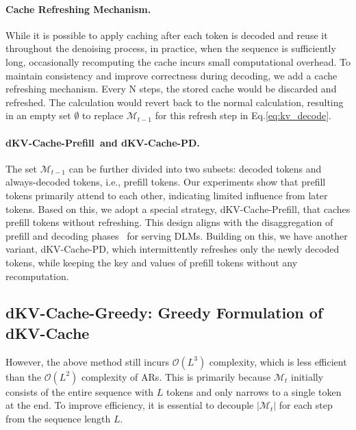 \documentclass{article}
\newcommand{\pmethodname}{dKV-Cache-Prefill}
\newcommand{\pdmethodname}{dKV-Cache-PD}
\begin{document}
\paragraph{Cache Refreshing Mechanism.} While it is possible to apply caching after each token is decoded and reuse it throughout the denoising process, in practice, when the sequence is sufficiently long, occasionally recomputing the cache incurs small computational overhead. To maintain consistency and improve correctness during decoding, we add a cache refreshing mechanism. Every N steps, the stored cache would be discarded and refreshed. The calculation would revert back to the normal calculation, resulting in an empty set $\emptyset$ to replace $\mathcal{M}_{t-1}$ for this refresh step in Eq.\ref{eq:kv_decode}. 

\paragraph{\pmethodname\ and \pdmethodname.} The set $\mathcal{M}_{t-1}$ can be further divided into two subsets: decoded tokens and always-decoded tokens, i.e., prefill tokens. Our experiments show that prefill tokens primarily attend to each other, indicating limited influence from later tokens. Based on this, we adopt a special strategy, \pmethodname, that caches prefill tokens without refreshing. This design aligns with the disaggregation of prefill and decoding phases~\cite{Zhong2024DistServeDP} for serving DLMs. Building on this, we have another variant, \pdmethodname, which intermittently refreshes only the newly decoded tokens, while keeping the key and values of prefill tokens without any recomputation.


\subsection{dKV-Cache-Greedy: Greedy Formulation of dKV-Cache}

However, the above method still incurs $\mathcal{O}(L^3)$ complexity, which is less efficient than the $\mathcal{O}(L^2)$ complexity of ARs. This is primarily because $\mathcal{M}_t$ initially consists of the entire sequence with $L$ tokens and only narrows to a single token at the end. To improve efficiency, it is essential to decouple $|\mathcal{M}_t|$ for each step from the sequence length $L$.
\end{document}
